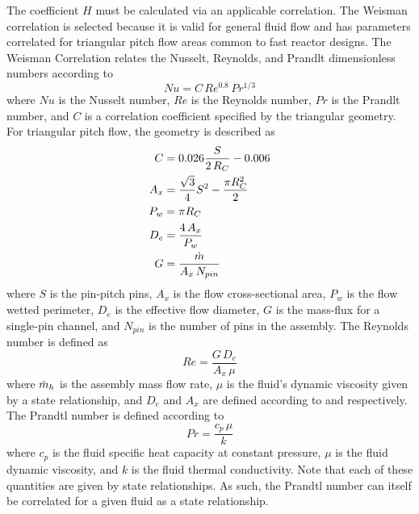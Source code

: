       The coefficient $H$ must be calculated via an applicable correlation.
      The Weisman correlation is selected because it is valid for general fluid
      flow and has parameters correlated for triangular pitch flow areas common
      to fast reactor designs. The Weisman Correlation relates the Nusselt,
      Reynolds, and Prandlt dimensionless numbers according to
      \begin{equation}
        \label{eq:weisman}
        Nu = C \, Re^{0.8} \, Pr^{1/3}
      \end{equation}
      where $Nu$ is the Nusselt number, $Re$ is the Reynolds number, $Pr$ is 
      the Prandlt number, and $C$ is a correlation coefficient specified by the
      triangular geometry. For triangular pitch flow, the geometry is described
      as
      \begin{align}
        \label{eq:weisman_c}
        C &= 0.026 \frac{S}{2 \, R_C} - 0.006 \\
        \label{eq:weisman_ax}
        A_x &= \frac{\sqrt{3}}{4} S^2 - \frac{\pi R_C^2}{2} \\
        \label{eq:weisman_pw}
        P_w &= \pi R_C \\
        \label{eq:weisman_de}
        D_e &= \frac{4 \, A_x}{P_w} \\
        \label{eq:weisman_g}
        G &= \frac{\dot{m}}{A_x \, N_{pin}}
      \end{align}
      where $S$ is the pin-pitch pins, $A_x$ is the
      flow cross-sectional area, $P_w$ is the flow wetted perimeter, $D_e$
      is the effective flow diameter, $G$ is the mass-flux for a single-pin
      channel, and $N_{pin}$ is the number of pins in the assembly. The Reynolds
      number is defined as
      \begin{equation}
        \label{eq:re}
        Re = \frac{G \, D_e}{A_x \, \mu}
      \end{equation}
      where $\dot{m}_h$ is the assembly mass flow rate, $\mu$ is the fluid's
      dynamic viscosity given by a state relationship, and $D_e$ and $A_x$ are 
      defined according to  and 
      respectively. The Prandtl number is defined according to 
      \begin{equation}
        \label{eq:pr}
        Pr = \frac{c_p \, \mu}{k}
      \end{equation}
      where $c_p$ is the fluid specific heat capacity at constant pressure, 
      $\mu$ is the fluid dynamic viscosity, and $k$ is the fluid thermal 
      conductivity. Note that each of these quantities are given by state 
      relationships. As such, the Prandtl number can itself be correlated for a
      given fluid as a state relationship.
      
